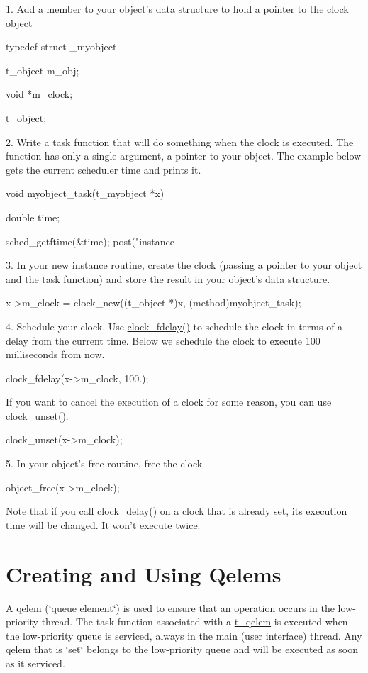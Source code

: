 1. Add a member to your object's data structure to hold a pointer to the clock object 
\begin{DoxyCode}
    typedef struct _myobject
    {
        t_object m_obj;
    
        void *m_clock;
    } t_object;
\end{DoxyCode}


2. Write a task function that will do something when the clock is executed. The function has only a single argument, a pointer to your object. The example below gets the current scheduler time and prints it.


\begin{DoxyCode}
    void myobject_task(t_myobject *x)
    {
        double time;

        sched_getftime(&time);
        post("instance %
    }
\end{DoxyCode}


3. In your new instance routine, create the clock (passing a pointer to your object and the task function) and store the result in your object's data structure. 
\begin{DoxyCode}
        x->m_clock = clock_new((t_object *)x, (method)myobject_task);
\end{DoxyCode}


4. Schedule your clock. Use \hyperlink{group__clocks_ga61719f0e0379fffbe79ae2bd5699b66f}{clock\_\-fdelay()} to schedule the clock in terms of a delay from the current time. Below we schedule the clock to execute 100 milliseconds from now. 
\begin{DoxyCode}
        clock_fdelay(x->m_clock, 100.);
\end{DoxyCode}


If you want to cancel the execution of a clock for some reason, you can use \hyperlink{group__clocks_ga64f5f8a027b39c1c14464744a9cc08ce}{clock\_\-unset()}. 
\begin{DoxyCode}
        clock_unset(x->m_clock);
\end{DoxyCode}


5. In your object's free routine, free the clock 
\begin{DoxyCode}
        object_free(x->m_clock);
\end{DoxyCode}


Note that if you call \hyperlink{group__clocks_ga9ac56d198904627333de740743086920}{clock\_\-delay()} on a clock that is already set, its execution time will be changed. It won't execute twice.\hypertarget{chapter_scheduler_chapter_scheduler_qelems}{}\section{Creating and Using Qelems}\label{chapter_scheduler_chapter_scheduler_qelems}
A qelem (\char`\"{}queue element\char`\"{}) is used to ensure that an operation occurs in the low-\/priority thread. The task function associated with a \hyperlink{group__qelems_ga4d219449d88d2b9648a992152b278090}{t\_\-qelem} is executed when the low-\/priority queue is serviced, always in the main (user interface) thread. Any qelem that is \char`\"{}set\char`\"{} belongs to the low-\/priority queue and will be executed as soon as it serviced.

